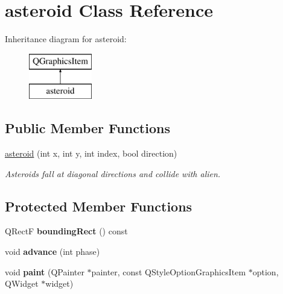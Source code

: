\hypertarget{classasteroid}{\section{asteroid Class Reference}
\label{classasteroid}
}
Inheritance diagram for asteroid\-:\begin{figure}[H]
\begin{center}
\leavevmode
\includegraphics[height=2.000000cm]{classasteroid}
\end{center}
\end{figure}
\subsection*{Public Member Functions}
\begin{DoxyCompactItemize}
\item 
\hyperlink{classasteroid_a7d5c88c543014eb37658e6a45eabe4cb}{asteroid} (int x, int y, int index, bool direction)
\begin{DoxyCompactList}\small\item\em Asteroids fall at diagonal directions and collide with alien. \end{DoxyCompactList}\end{DoxyCompactItemize}
\subsection*{Protected Member Functions}
\begin{DoxyCompactItemize}
\item 
\hypertarget{classasteroid_a9ee6e14e69b3b254b6aa4946dd28ce48}{Q\-Rect\-F {\bfseries bounding\-Rect} () const }\label{classasteroid_a9ee6e14e69b3b254b6aa4946dd28ce48}

\item 
\hypertarget{classasteroid_a09376158d971cab08d4e142c07edddaa}{void {\bfseries advance} (int phase)}\label{classasteroid_a09376158d971cab08d4e142c07edddaa}

\item 
\hypertarget{classasteroid_aa13c3feaa152524d648288e5a775a98e}{void {\bfseries paint} (Q\-Painter $\ast$painter, const Q\-Style\-Option\-Graphics\-Item $\ast$option, Q\-Widget $\ast$widget)}\label{classasteroid_aa13c3feaa152524d648288e5a775a98e}

\end{DoxyCompactItemize}
